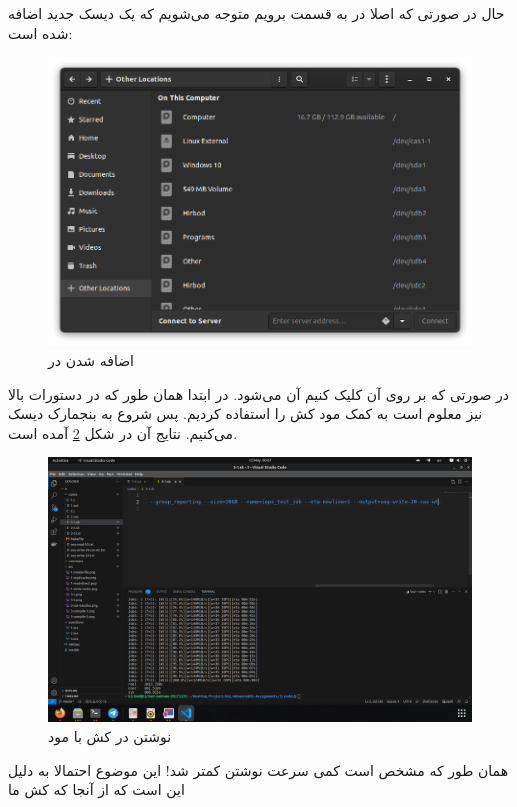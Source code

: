 حال در صورتی که اصلا در
به قسمت
برویم متوجه می‌شویم که یک دیسک جدید اضافه شده است:
\begin{figure}[H]
    \centering
    \includegraphics[scale=0.5]{pic/3-cas-nautilus.png}
    \caption{اضافه شدن  در }
    \label{fig:cas_in_file_explorer}
\end{figure}
در صورتی که بر روی آن کلیک کنیم آن
می‌شود. در ابتدا همان طور که در دستورات بالا نیز معلوم است به کمک مود
کش را استفاده کردیم. پس شروع به بنجمارک دیسک می‌کنیم. نتایج آن در شکل
\ref{fig:3-4-wt}
آمده است.
\begin{figure}[H]
    \centering
    \includegraphics[scale=0.25]{pic/3-wt.png}
    \caption{نوشتن در کش با مود }
    \label{fig:3-4-wt}
\end{figure}
همان طور که مشخص است کمی سرعت نوشتن کمتر شد! این موضوع احتمالا به دلیل این است که از آنجا که کش ما
